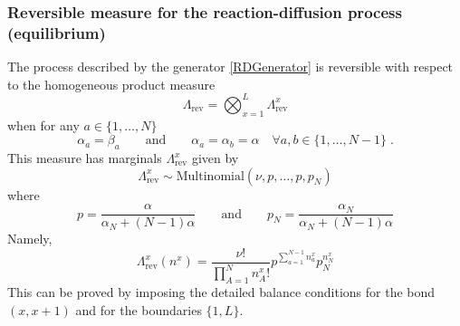 \documentclass[10pt]{article}
\numberwithin{equation}{section}
\numberwithin{equation}{subsection}
\newcommand{\dt}{\;.}
\newcommand{\twoj}{\nu}
\begin{document}
\subsubsection{Reversible measure for the reaction-diffusion process (equilibrium)} 
The process described by the generator \eqref{RDGenerator} is reversible with respect to the homogeneous product measure \begin{equation}\label{reversibleMeasureRD}
	\Lambda_{\text{rev}}=\bigotimes_{x=1}^{L}\Lambda_{\text{rev}}^{x}
\end{equation}
when for any $a\in\{1,\ldots,N\}$
\begin{equation}\label{reversibilityConditionRD}
	\alpha_{a}=\beta_{a}\qquad\text{and}\qquad \alpha_{a}=\alpha_{b}=\alpha \quad \forall a,b\in \{1,\ldots,N-1\}\dt
\end{equation}
This measure has marginals $\Lambda_{\text{rev}}^{x}$ given by 
\begin{equation}
	\Lambda^{x}_{\text{rev}}\sim \text{Multinomial}\left(\twoj,p,\ldots,p,p_{N}\right)
\end{equation}
where 
\begin{equation}
	p=\frac{\alpha}{\alpha_{N}+(N-1)\alpha}\qquad \text{and}\qquad p_{N}=\frac{\alpha_{N}}{\alpha_{N}+(N-1)\alpha}
\end{equation}
Namely,
\begin{equation}
	\Lambda_{\text{rev}}^{x}(n^{x})=\frac{\nu!}{\prod_{A=1}^{N}n_{A}^{x}!}p^{\sum_{a=1}^{N-1}n_{a}^{x}}p_{N}^{n_{N}^{x}}
\end{equation}
This can be proved by imposing the detailed balance conditions for the bond $(x,x+1)$ and for the boundaries $\{1,L\}$.\\
\end{document}
